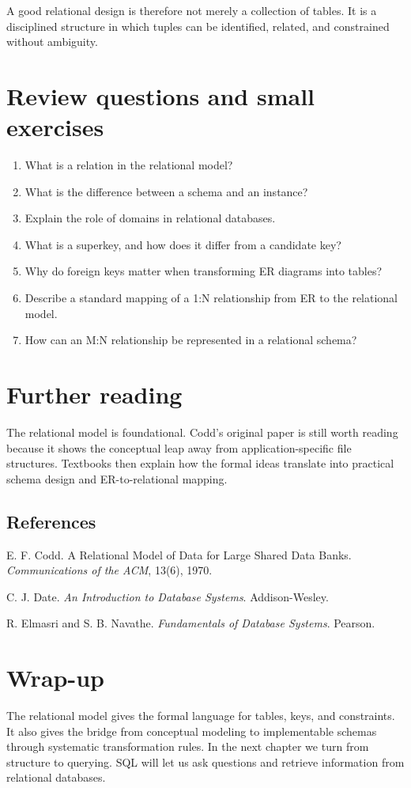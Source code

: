 \documentclass[11pt,a4paper,openany]{book}
\makeatletter
\renewenvironment{thebibliography}[1]
 {\subsection*{References}%
  \list{\@biblabel{\@arabic\c@enumiv}}%
   {\settowidth\labelwidth{\@biblabel{#1}}%
    \leftmargin\labelwidth\advance\leftmargin\labelsep
    \usecounter{enumiv}\let\p@enumiv\@empty
    \renewcommand\theenumiv{\@arabic\c@enumiv}}%
  \sloppy\clubpenalty4000\widowpenalty4000}
 {\endlist}
\makeatother
\begin{document}
A good relational design is therefore not merely a collection of tables. It is a disciplined structure in which tuples can be identified, related, and constrained without ambiguity.

\section{Review questions and small exercises}
\begin{enumerate}
\item What is a relation in the relational model?
\item What is the difference between a schema and an instance?
\item Explain the role of domains in relational databases.
\item What is a superkey, and how does it differ from a candidate key?
\item Why do foreign keys matter when transforming ER diagrams into tables?
\item Describe a standard mapping of a 1:N relationship from ER to the relational model.
\item How can an M:N relationship be represented in a relational schema?
\end{enumerate}

\section{Further reading}
The relational model is foundational. Codd's original paper is still worth reading because it shows the conceptual leap away from application-specific file structures. Textbooks then explain how the formal ideas translate into practical schema design and ER-to-relational mapping.

\begin{thebibliography}{9}
E. F. Codd.
A Relational Model of Data for Large Shared Data Banks.
\textit{Communications of the ACM}, 13(6), 1970.

C. J. Date.
\textit{An Introduction to Database Systems}. Addison-Wesley.

R. Elmasri and S. B. Navathe.
\textit{Fundamentals of Database Systems}. Pearson.
\end{thebibliography}

\section{Wrap-up}
The relational model gives the formal language for tables, keys, and constraints. It also gives the bridge from conceptual modeling to implementable schemas through systematic transformation rules. In the next chapter we turn from structure to querying. SQL will let us ask questions and retrieve information from relational databases.
\end{document}
